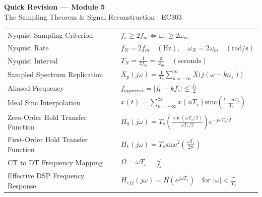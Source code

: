 \documentclass[12pt,a4paper]{article}
\renewcommand{\arraystretch}{1.45}
\begin{document}
\newpage
\begin{center}
  {\large\bfseries\color{myred} Quick Revision --- Module 5}\\[3pt]
  {\small\color{mydark} The Sampling Theorem \& Signal Reconstruction $|$ EC303}
\end{center}
\noindent{\color{myred}\rule{\linewidth}{1.2pt}}
\vspace{4pt}

\begin{tcolorbox}[formulabox, title={\textbf{Key Formulas at a Glance}}]
\renewcommand{\arraystretch}{1.35}
\begin{tabularx}{\linewidth}{B{5.0cm} X}
Nyquist Sampling Criterion & $f_s \ge 2 f_m \iff \omega_s \ge 2 \omega_m$ \\[4pt]
Nyquist Rate & $f_N = 2 f_m \quad (\text{Hz}), \quad \omega_N = 2 \omega_m \quad (\text{rad/s})$ \\[4pt]
Nyquist Interval & $T_N = \frac{1}{2 f_m} = \frac{\pi}{\omega_m} \quad (\text{seconds})$ \\[4pt]
Sampled Spectrum Replication & $X_p(j\omega) = \frac{1}{T_s} \sum_{k=-\infty}^{\infty} X\big(j(\omega - k \omega_s)\big)$ \\[4pt]
Aliased Frequency & $f_{apparent} = |f_0 - k f_s| \le \frac{f_s}{2}$ \\[4pt]
Ideal Sinc Interpolation & $x(t) = \sum_{n=-\infty}^{\infty} x(n T_s) \text{sinc}\left(\frac{t - n T_s}{T_s}\right)$ \\[4pt]
Zero-Order Hold Transfer Function & $H_0(j\omega) = T_s \left(\frac{\sin(\omega T_s / 2)}{\omega T_s / 2}\right) e^{-j\omega T_s / 2}$ \\[4pt]
First-Order Hold Transfer Function & $H_1(j\omega) = T_s \text{sinc}^2\left(\frac{\omega T_s}{2\pi}\right)$ \\[4pt]
CT to DT Frequency Mapping & $\Omega = \omega T_s = \frac{\omega}{f_s}$ \\[4pt]
Effective DSP Frequency Response & $H_{eff}(j\omega) = H(e^{j\omega T_s}) \quad \text{for } |\omega| < \frac{\pi}{T_s}$ \\[4pt]
\end{tabularx}
\end{tcolorbox}
\end{document}
